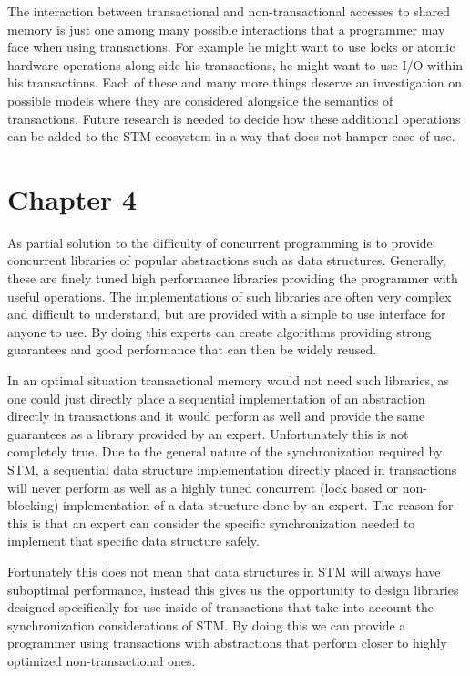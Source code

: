 The interaction between transactional and non-transactional accesses to shared memory
is just one among many possible interactions that a programmer may face when using
transactions.
For example he might want to use locks or atomic hardware operations along side his transactions,
he might want to use I/O within his transactions.
Each of these and many more things deserve an investigation on possible models where
they are considered alongside the semantics of transactions.
Future research is needed to decide how these additional operations can be added
to the STM ecosystem in a way that does not hamper ease of use.








\section{Chapter 4}
As partial solution to the difficulty of concurrent programming
is to provide concurrent libraries of popular abstractions such as data structures.
Generally, these are finely tuned high performance libraries
providing the programmer with useful operations.
The implementations of such libraries are often very complex
and difficult to understand, but are provided with a simple to use
interface for anyone to use.
By doing this experts can create algorithms providing strong guarantees
and good performance that can then be widely reused.

In an optimal situation transactional memory would not need such libraries,
as one could just directly place a sequential implementation of an abstraction
directly in transactions and it would perform as well and provide the same
guarantees as a library provided by an expert.
Unfortunately this is not completely true.
Due to the general nature
of the synchronization required by STM, a sequential data structure implementation directly
placed in transactions will never perform as well as a highly tuned concurrent
(lock based or non-blocking) implementation of a data structure done by an expert.
The reason for this is that an expert can consider the specific synchronization needed to implement
that specific data structure safely.

Fortunately this does not mean that data structures in STM will always have suboptimal performance,
instead this gives us the opportunity to design libraries designed specifically for use inside
of transactions that take into account the synchronization considerations
of STM.
By doing this we can provide a programmer using transactions with abstractions that perform closer
to highly optimized non-transactional ones.

